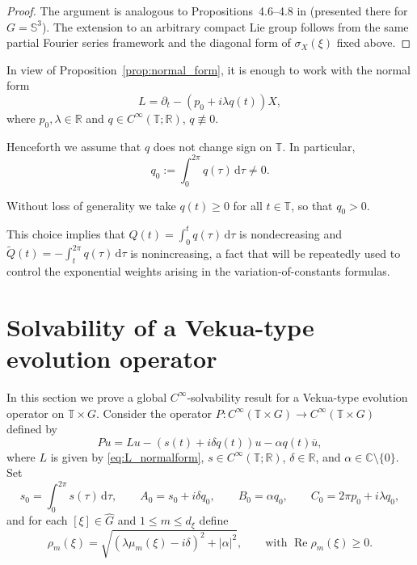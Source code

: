\documentclass[11pt,reqno]{amsart}
\numberwithin{equation}{section}
\begin{document}
	\begin{proof}
		The argument is analogous to Propositions~4.6--4.8 in \cite{KMR20} (presented there for $G=\mathbb{S}^3$). The extension to an arbitrary compact Lie group follows from the same partial Fourier series framework and the diagonal form of $\sigma_X(\xi)$ fixed above.
	\end{proof}
	
	In view of Proposition~\ref{prop:normal_form}, it is enough to work with the normal form
	\begin{equation}\label{eq:L_normalform}
		L=\partial_t-(p_0+i\lambda q(t))X,
	\end{equation}
	where $p_0,\lambda\in\mathbb{R}$ and $q\in C^\infty(\mathbb{T};\mathbb{R})$, $q\not\equiv 0$.
	
	Henceforth we assume that $q$ does not change sign on $\mathbb{T}$. In particular,
	\[
	q_0:=\int_0^{2\pi}q(\tau)\,\mathrm{d}\tau\neq 0.
	\]
	
	Without loss of generality we take $q(t)\ge 0$ for all $t\in\mathbb{T}$, so that $q_0>0$.
		
	This choice implies that $Q(t)=\int_0^t q(\tau)\,\mathrm{d}\tau$ is nondecreasing and $\widetilde Q(t)=-\int_t^{2\pi}q(\tau)\,\mathrm{d}\tau$ is nonincreasing, a fact that will be repeatedly used to control the exponential weights arising in the variation-of-constants formulas.
	
	\section{Solvability of a Vekua-type evolution operator}\label{sec:solvability}

	In this section we prove a global $C^\infty$-solvability result for a Vekua-type evolution operator on $\mathbb{T}\times G$.  Consider the operator $P:C^\infty(\mathbb{T}\times G)\to C^\infty(\mathbb{T}\times G)$ defined by
	\begin{equation}\label{eq:P_cv}
		Pu=Lu-(s(t)+i\delta q(t))u-\alpha q(t)\overline{u},
	\end{equation}
	where $L$ is given by \eqref{eq:L_normalform}, $s\in C^\infty(\mathbb{T};\mathbb{R})$, $\delta\in\mathbb{R}$, and $\alpha\in\mathbb{C}\setminus\{0\}$.
	Set
	\[
	s_0=\int_0^{2\pi}s(\tau)\,\mathrm{d}\tau,\qquad
	A_0=s_0+i\delta q_0,\qquad
	B_0=\alpha q_0,\qquad
	C_0=2\pi p_0+i\lambda q_0,
	\]
	and for each $[\xi]\in\widehat{G}$ and $1\le m\le d_\xi$ define
	\[
	\rho_m(\xi)=\sqrt{(\lambda\mu_m(\xi)-i\delta)^2+|\alpha|^2},
	\qquad \text{with }\operatorname{Re}\rho_m(\xi)\ge 0.
	\]
\end{document}
